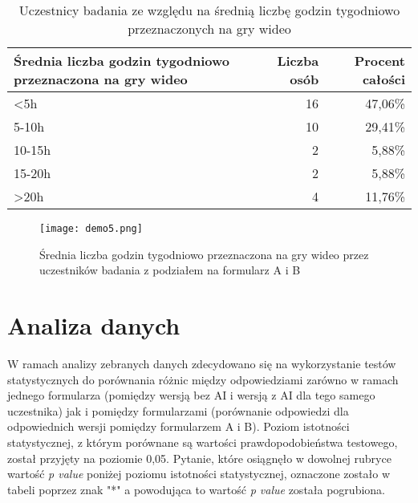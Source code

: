 \begin{table}[h!]
    \begin{center}
        \begin{tabular}{|m{15em}|r|r|}
            \hline
            Średnia liczba godzin tygodniowo \newline przeznaczona na gry wideo & Liczba osób & Procent całości \\
            \hline
            <5h                                                                 & 16          & 47,06\%         \\
            5-10h                                                               & 10          & 29,41\%         \\
            10-15h                                                              & 2           & 5,88\%          \\
            15-20h                                                              & 2           & 5,88\%          \\
            >20h                                                                & 4           & 11,76\%         \\
            \hline
        \end{tabular}
    \end{center}
    \caption{Uczestnicy badania ze względu na średnią liczbę godzin tygodniowo przeznaczonych na gry wideo}\label{tab1:ch7_5}
\end{table}

\begin{figure}[h!]
    \centering
    \texttt{[image: demo5.png]}
    \caption{Średnia liczba godzin tygodniowo przeznaczona na gry wideo przez uczestników badania z podziałem na formularz A i B}
    \label{fig:ch7_demo5}
\end{figure}

\newpage

\section{Analiza danych}\label{section:ch7_2}

W ramach analizy zebranych danych zdecydowano się na wykorzystanie testów statystycznych do porównania różnic między
odpowiedziami zarówno w ramach jednego formularza (pomiędzy wersją bez AI i wersją z AI dla tego samego uczestnika)
jak i pomiędzy formularzami (porównanie odpowiedzi dla odpowiednich wersji pomiędzy formularzem A i B). Poziom
istotności statystycznej, z którym porównane są wartości prawdopodobieństwa testowego, został przyjęty na poziomie 0,05.
Pytanie, które osiągnęło w dowolnej rubryce wartość \textit{p value} poniżej poziomu istotności statystycznej,
oznaczone zostało w tabeli poprzez znak "*" a powodująca to wartość \textit{p value} została pogrubiona.

